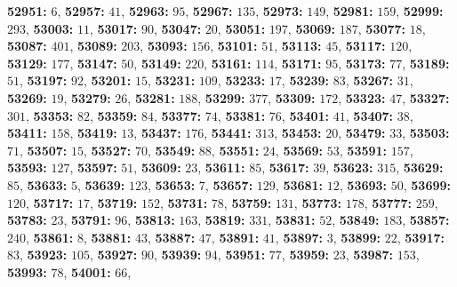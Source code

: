 \textsf{\bfseries 52951:} $6$, \textsf{\bfseries 52957:} $41$, \textsf{\bfseries 52963:} $95$, \textsf{\bfseries 52967:} $135$, \textsf{\bfseries 52973:} $149$, \textsf{\bfseries 52981:} $159$, \textsf{\bfseries 52999:} $293$, \textsf{\bfseries 53003:} $11$, \textsf{\bfseries 53017:} $90$, \textsf{\bfseries 53047:} $20$, \textsf{\bfseries 53051:} $197$, \textsf{\bfseries 53069:} $187$, \textsf{\bfseries 53077:} $18$, \textsf{\bfseries 53087:} $401$, \textsf{\bfseries 53089:} $203$, \textsf{\bfseries 53093:} $156$, \textsf{\bfseries 53101:} $51$, \textsf{\bfseries 53113:} $45$, \textsf{\bfseries 53117:} $120$, \textsf{\bfseries 53129:} $177$, \textsf{\bfseries 53147:} $50$, \textsf{\bfseries 53149:} $220$, \textsf{\bfseries 53161:} $114$, \textsf{\bfseries 53171:} $95$, \textsf{\bfseries 53173:} $77$, \textsf{\bfseries 53189:} $51$, \textsf{\bfseries 53197:} $92$, \textsf{\bfseries 53201:} $15$, \textsf{\bfseries 53231:} $109$, \textsf{\bfseries 53233:} $17$, \textsf{\bfseries 53239:} $83$, \textsf{\bfseries 53267:} $31$, \textsf{\bfseries 53269:} $19$, \textsf{\bfseries 53279:} $26$, \textsf{\bfseries 53281:} $188$, \textsf{\bfseries 53299:} $377$, \textsf{\bfseries 53309:} $172$, \textsf{\bfseries 53323:} $47$, \textsf{\bfseries 53327:} $301$, \textsf{\bfseries 53353:} $82$, \textsf{\bfseries 53359:} $84$, \textsf{\bfseries 53377:} $74$, \textsf{\bfseries 53381:} $76$, \textsf{\bfseries 53401:} $41$, \textsf{\bfseries 53407:} $38$, \textsf{\bfseries 53411:} $158$, \textsf{\bfseries 53419:} $13$, \textsf{\bfseries 53437:} $176$, \textsf{\bfseries 53441:} $313$, \textsf{\bfseries 53453:} $20$, \textsf{\bfseries 53479:} $33$, \textsf{\bfseries 53503:} $71$, \textsf{\bfseries 53507:} $15$, \textsf{\bfseries 53527:} $70$, \textsf{\bfseries 53549:} $88$, \textsf{\bfseries 53551:} $24$, \textsf{\bfseries 53569:} $53$, \textsf{\bfseries 53591:} $157$, \textsf{\bfseries 53593:} $127$, \textsf{\bfseries 53597:} $51$, \textsf{\bfseries 53609:} $23$, \textsf{\bfseries 53611:} $85$, \textsf{\bfseries 53617:} $39$, \textsf{\bfseries 53623:} $315$, \textsf{\bfseries 53629:} $85$, \textsf{\bfseries 53633:} $5$, \textsf{\bfseries 53639:} $123$, \textsf{\bfseries 53653:} $7$, \textsf{\bfseries 53657:} $129$, \textsf{\bfseries 53681:} $12$, \textsf{\bfseries 53693:} $50$, \textsf{\bfseries 53699:} $120$, \textsf{\bfseries 53717:} $17$, \textsf{\bfseries 53719:} $152$, \textsf{\bfseries 53731:} $78$, \textsf{\bfseries 53759:} $131$, \textsf{\bfseries 53773:} $178$, \textsf{\bfseries 53777:} $259$, \textsf{\bfseries 53783:} $23$, \textsf{\bfseries 53791:} $96$, \textsf{\bfseries 53813:} $163$, \textsf{\bfseries 53819:} $331$, \textsf{\bfseries 53831:} $52$, \textsf{\bfseries 53849:} $183$, \textsf{\bfseries 53857:} $240$, \textsf{\bfseries 53861:} $8$, \textsf{\bfseries 53881:} $43$, \textsf{\bfseries 53887:} $47$, \textsf{\bfseries 53891:} $41$, \textsf{\bfseries 53897:} $3$, \textsf{\bfseries 53899:} $22$, \textsf{\bfseries 53917:} $83$, \textsf{\bfseries 53923:} $105$, \textsf{\bfseries 53927:} $90$, \textsf{\bfseries 53939:} $94$, \textsf{\bfseries 53951:} $77$, \textsf{\bfseries 53959:} $23$, \textsf{\bfseries 53987:} $153$, \textsf{\bfseries 53993:} $78$, \textsf{\bfseries 54001:} $66$, 
